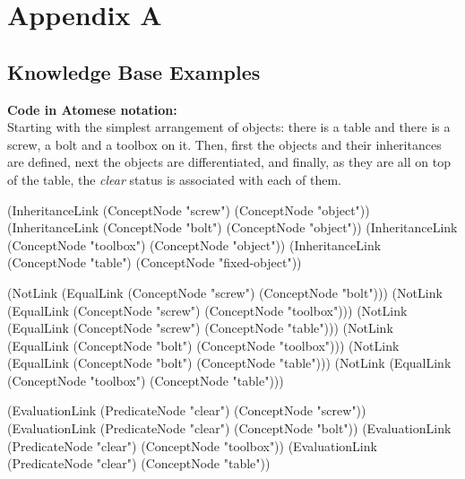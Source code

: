 \chapter{Appendix A} \label{AppendixA}

\section{Knowledge Base Examples}\label{sec:KB_examples} 

\begin{footnotesize}
\textbf{Code in Atomese notation:} \\
Starting with the simplest arrangement of objects: there is a table and there is a screw, a bolt and a toolbox on it. Then, first the objects and their inheritances are defined, next the objects are differentiated, and finally, as they are all on top of the table, the \textit{clear} status is associated with each of them. \\
\end{footnotesize}

\begin{python}
	(InheritanceLink
		(ConceptNode "screw")
		(ConceptNode "object"))
	(InheritanceLink
		(ConceptNode "bolt")
		(ConceptNode "object"))
	(InheritanceLink
		(ConceptNode "toolbox")
		(ConceptNode "object"))
	(InheritanceLink
		(ConceptNode "table")
		(ConceptNode "fixed-object"))

	(NotLink (EqualLink 
		(ConceptNode "screw") (ConceptNode "bolt")))
	(NotLink (EqualLink 
		(ConceptNode "screw") (ConceptNode "toolbox")))
	(NotLink (EqualLink 
		(ConceptNode "screw") (ConceptNode "table")))
	(NotLink (EqualLink 
		(ConceptNode "bolt") (ConceptNode "toolbox")))
	(NotLink (EqualLink 
		(ConceptNode "bolt") (ConceptNode "table")))
	(NotLink (EqualLink 
		(ConceptNode "toolbox") (ConceptNode "table")))
	
	(EvaluationLink
		(PredicateNode "clear")
		(ConceptNode "screw"))
	(EvaluationLink
		(PredicateNode "clear")
		(ConceptNode "bolt"))
	(EvaluationLink
		(PredicateNode "clear")
		(ConceptNode "toolbox"))
	(EvaluationLink
		(PredicateNode "clear")
		(ConceptNode "table"))
\end{python}

